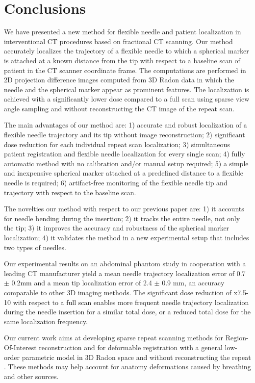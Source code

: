 \section*{Conclusions}
We have presented a new method for flexible needle and patient localization in interventional CT procedures based on fractional CT scanning.
Our method accurately localizes the trajectory of a flexible needle to which a spherical marker is attached at a known distance from the tip with respect to a baseline scan of patient in the CT scanner coordinate frame. The computations are performed in 2D projection difference images computed from 3D Radon data in which the needle and the spherical marker appear as prominent features. 
The localization is achieved with a significantly lower dose compared to a full scan using sparse view angle sampling and without reconstructing the CT image of the repeat scan.

The main advantages of our method are:
1) accurate and robust localization of a flexible needle trajectory and its tip without image reconstruction;
2) significant dose reduction for each individual repeat scan localization;
3) simultaneous patient registration and flexible needle localization for every single scan; 
4) fully automatic method with no calibration and/or manual setup required; 
5) a simple and inexpensive spherical marker attached at a predefined distance to a flexible needle is required; 
6) artifact-free monitoring of the flexible needle tip and trajectory with respect to the baseline scan.

The novelties our method with respect to our previous paper are: 1) it accounts for needle bending during the insertion; 2) it tracks the entire needle, not only the tip; 3) it improves the accuracy and robustness of the spherical marker localization; 4) it validates the method in a new experimental setup that includes two types of needles. 

Our experimental results on an abdominal phantom study
in cooperation with a leading CT manufacturer yield a mean needle trajectory localization error of 0.7 $\pm$ 0.2mm and a mean tip localization error of 2.4 $\pm$ 0.9 mm, an accuracy comparable to other 3D imaging methods. The significant dose reduction of x7.5-10 with respect to a full scan enables more frequent needle trajectory localization during the needle insertion for a similar total dose, or a reduced total dose for the same localization frequency.

Our current work aims at developing sparse repeat scanning methods for Region-Of-Interest reconstruction and  for deformable registration with a general low-order parametric
model in 3D Radon space and without reconstructing the repeat \cite{adelmanmsc2018}. These methods may help account for anatomy deformations caused by breathing and other sources. 






